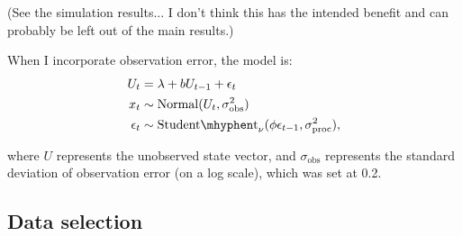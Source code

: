 \documentclass[10pt]{article}
\begin{document}
(See the simulation results... I don't think this has the intended benefit and can probably be left out of the main results.)

When I incorporate observation error, the model is:
\begin{align*}
U_t &= \lambda + b U_{t-1} + \epsilon_t\\
x_t &\sim \mathrm{Normal}(U_t, \sigma_\mathrm{obs}^2)\\
\epsilon_t &\sim \mathrm{Student\mhyphen t}_\nu(\phi \epsilon_{t-1}, \sigma_\mathrm{proc}^2),
\end{align*}

\noindent
where $U$ represents the unobserved state vector, and $\sigma_\mathrm{obs}$ represents the standard deviation of observation error (on a log scale), which was set at 0.2.



\subsection*{Data selection}
\end{document}
